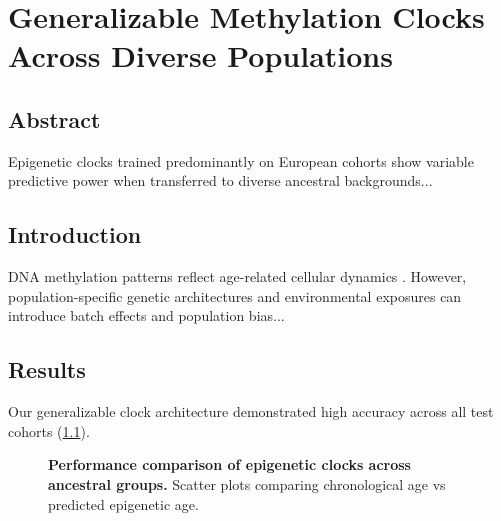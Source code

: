 \chapter{Generalizable Methylation Clocks Across Diverse Populations}
\label{ch:manuscript1}

\section{Abstract}
Epigenetic clocks trained predominantly on European cohorts show variable predictive power when transferred to diverse ancestral backgrounds...

\section{Introduction}
DNA methylation patterns reflect age-related cellular dynamics \cite{Jones2023}. However, population-specific genetic architectures and environmental exposures can introduce batch effects and population bias...

\section{Results}
Our generalizable clock architecture demonstrated high accuracy across all test cohorts (\cref{fig:clock_performance}).

\begin{figure}[htbp]
    \centering
    \singlespacing
    \caption[Performance comparison of epigenetic clocks across ancestral groups]{{\bfseries Performance comparison of epigenetic clocks across ancestral groups.} Scatter plots comparing chronological age vs predicted epigenetic age.}
    \label{fig:clock_performance}
\end{figure}
